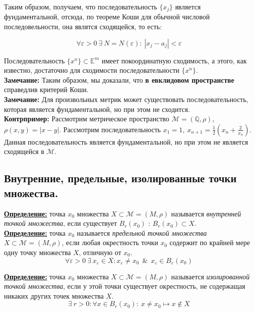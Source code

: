 \documentclass[a4paper,12pt]{article} %
\begin{document}
	Таким образом, получаем, что последовательность $\{ x_j \}$ является фундаментальной, отсюда, по теореме Коши для обычной числовой последовельности, она являтся сходящейся, то есть:
	
	\[ \forall \varepsilon > 0 ~ \exists ~ N = N(\varepsilon) : ~ |x_j - a_j| < \varepsilon \]
	
	Последовательность $\{x^n \} \subset \mathbb{E}^m$  имеет покоординатную сходимость, а этого, как известно, достаточно для сходимости последовательности $\{x^n \}$.\\
	
	\textbf{Замечание:} Таким образом, мы доказали, что \textbf{в евклидовом пространстве} справедлив критерий Коши.\\
	
	\textbf{Замечание:} Для произвольных метрик может существовать последовательность, которая является фундаментальной, но при этом не сходится.\\
	
	\textbf{Контрпример:} Рассмотрим метрическое пространство $\mathscr{M} = (\mathbb{Q}, \rho)$, $\rho(x, y) = |x - y|$. Рассмотрим последовательность $x_1 = 1, ~ x_{n + 1} = \frac{1}{2}(x_n + \frac{2}{x_n})$. Данная последовательность является фундаментальной, но при этом не является сходящейся в $\mathscr{M}$.\\
	
	\subsection{Внутренние, предельные, изолированные точки множества.}
	
	\underline{\textbf{Определение:}} точка $x_0$ множества $X \subset \mathscr{M} = (M, \rho)$ называется \textit{внутренней точкой множества}, если существует $B_{r}(x_0)$ : $B_{r}(x_0) \subset X$.\\
	
	\underline{\textbf{Определение:}} точка $x_0$ называется \textit{предельной точкой множества} $X \subset \mathscr{M} = (M, \rho)$, если любая окрестность точки $x_0$ содержит по крайней мере одну точку множества $X$, отличную от $x_0$.
	\[ \forall \varepsilon > 0 ~ \exists ~ x_{\varepsilon} \in X : x_{\varepsilon} \neq x_0 ~~ \& ~~ x_{\varepsilon} \in B_{\varepsilon}(x_0) \]
	
	\underline{\textbf{Определение:}} точка $x_0$ множества $X \subset \mathscr{M} = (M, \rho)$ называется \textit{изолированной точкой множества}, если у этой точки существует окрестность, не содержащая никаких других точек множества $X$.
	\[ \exists ~ r > 0 : \forall x \in B_r(x_0) : ~ x \neq x_0 \mapsto x \notin X \]
	
\end{document}
